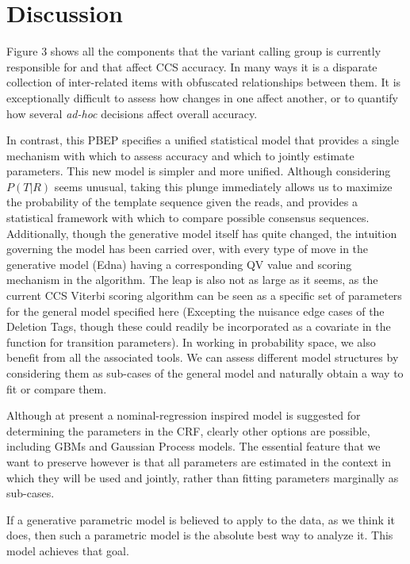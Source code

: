 \documentclass[fleqn,10pt]{SelfArx} %
\begin{document}
\section{Discussion}

Figure 3 shows all the components that the variant calling group is currently responsible for and that affect CCS accuracy.  In many ways it is a disparate collection of inter-related items with obfuscated relationships between them.  It is exceptionally difficult to assess how changes in one affect another, or to quantify how several \textit{ad-hoc} decisions affect overall accuracy.

In contrast, this PBEP specifies a unified statistical model that provides a single mechanism with which to assess accuracy and which to jointly estimate parameters.  This new model is simpler and more unified.  Although considering $P(T|R)$ seems unusual, taking this plunge immediately allows us to maximize the probability of the template sequence given the reads, and provides a statistical framework with which to compare possible consensus sequences.  Additionally, though the generative model itself has quite changed, the intuition governing the model has been carried over, with every type of move in the generative model (Edna) having a corresponding QV value and scoring mechanism in the algorithm.  The leap is also not as large as it seems, as the current CCS Viterbi scoring algorithm can be seen as a specific set of parameters for the general model specified here (Excepting the nuisance edge cases of the Deletion Tags, though these could readily be incorporated as a covariate in the function for transition parameters).  In working in probability space, we also benefit from all the associated tools.  We can assess different model structures by considering them as sub-cases of the general model and naturally obtain a way to fit or compare them.

Although at present a nominal-regression inspired model is suggested for determining the parameters in the CRF, clearly other options are possible, including GBMs and Gaussian Process models.  The essential feature that we want to preserve however is that all parameters are estimated in the context in which they will be used and jointly, rather than fitting parameters marginally as sub-cases.

If a generative parametric model is believed to apply to the data, as we think it does, then such a parametric model is the absolute best way to analyze it.  This model achieves that goal.


\end{document}
